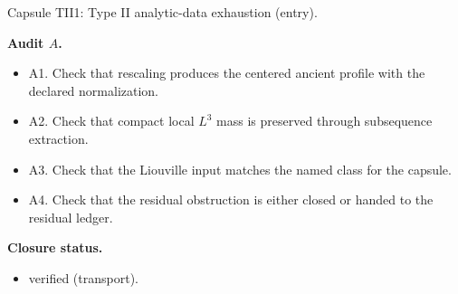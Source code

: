 \documentclass[11pt]{amsart}
\newcommand{\capsulefield}[1]{\par\smallskip\noindent\textbf{#1.}\ }
\begin{document}
\begin{proofcapsule}{Capsule TII1: Type II analytic-data exhaustion (entry).}
  \capsulefield{Audit \(A\)}
  \begin{itemize}[leftmargin=1.8em]
  \item A1. Check that rescaling produces the centered ancient profile with the declared normalization.
  \item A2. Check that compact local $L^3$ mass is preserved through subsequence extraction.
  \item A3. Check that the Liouville input matches the named class for the capsule.
  \item A4. Check that the residual obstruction is either closed or handed to the residual ledger.
  \end{itemize}
  \capsulefield{Closure status}
  \begin{itemize}[leftmargin=1.8em]
  \item verified (transport).
  \end{itemize}
\end{proofcapsule}
\end{document}
